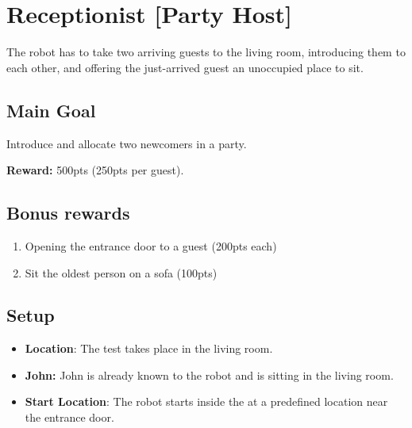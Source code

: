 \section{Receptionist [Party Host]}
\label{test:receptionist}
The robot has to take two arriving guests to the living room, introducing them to each other, and offering the just-arrived guest an unoccupied place to sit.



\subsection*{Main Goal}
Introduce and allocate two newcomers in a party.

\noindent\textbf{Reward:} 500pts (250pts per guest).

\subsection*{Bonus rewards}
\begin{enumerate}[nosep]
	\item Opening the entrance door to a guest (200pts each)
	\item Sit the oldest person on a sofa (100pts)
\end{enumerate}


\subsection*{Setup}
\begin{itemize}
	\item \textbf{Location}: The test takes place in the living room.

	\item \textbf{John:} John is already known to the robot and is sitting in the living room.

	\item \textbf{Start Location}: The robot starts inside the \Arena{} at a predefined location near the entrance door.

\end{itemize}

